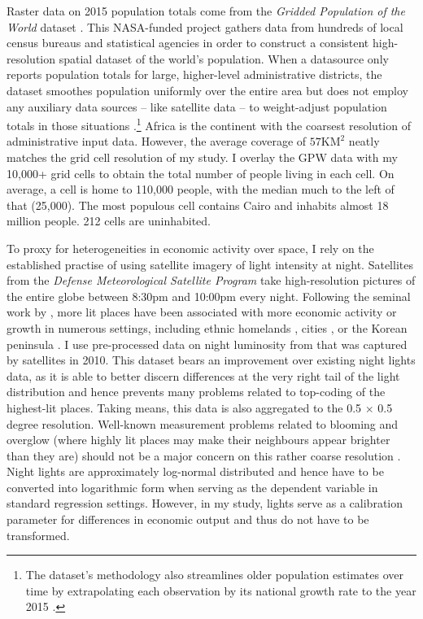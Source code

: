 \documentclass[11pt, oneside]{article}   	%
\begin{document}
Raster data on 2015 population totals come from the \textit{Gridded Population of the World} dataset \citep[GPW,][]{socioeconomic_data_and_applications_center_gridded_2016}. This NASA-funded project gathers data from hundreds of local census bureaus and statistical agencies in order to construct a consistent high-resolution spatial dataset of the world's population. When a datasource only reports population totals for large, higher-level administrative districts, the dataset smoothes population uniformly over the entire area but does not employ any auxiliary data sources -- like satellite data -- to weight-adjust population totals in those situations \citep{Doxsey-Whitfield_TakingAdvantageImproved_2015}.\footnote{The dataset's methodology also streamlines older population estimates over time by extrapolating each observation by its national growth rate to the year 2015 \citep{Doxsey-Whitfield_TakingAdvantageImproved_2015}.} Africa is the continent with the coarsest resolution of administrative input data. However, the average coverage of $57\textrm{KM}^{2}$ neatly matches the grid cell resolution of my study. I overlay the GPW data with my 10,000+ grid cells to obtain the total number of people living in each cell. On average, a cell is home to 110,000 people, with the median much to the left of that (25,000). The most populous cell contains Cairo and inhabits almost 18 million people. 212 cells are uninhabited.

To proxy for heterogeneities in economic activity over space, I rely on the established practise of using satellite imagery of light intensity at night. Satellites from the \textit{Defense Meteorological Satellite Program} take high-resolution pictures of the entire globe between 8:30pm and 10:00pm every night. Following the seminal work by \cite{henderson_measuring_2012}, more lit places have been associated with more economic activity or growth in numerous settings, including ethnic homelands \citep{michalopoulos_national_2014}, cities \citep{storeygard_farther_2016,Kocornik-Mina_Floodedcities_2015}, or the Korean peninsula \citep{Lee_InternationalIsolationRegional_2016}. I use pre-processed data on night luminosity from \cite{henderson_global_2018} that was captured by satellites in 2010. This dataset bears an improvement over existing night lights data, as it is able to better discern differences at the very right tail of the light distribution and hence prevents many problems related to top-coding of the highest-lit places. Taking means, this data is also aggregated to the 0.5 $\times$ 0.5 degree resolution. Well-known measurement problems related to blooming and overglow (where highly lit places may make their neighbours appear brighter than they are) should not be a major concern on this rather coarse resolution \citep{michalopoulos_spatial_2018}. Night lights are approximately log-normal distributed and hence have to be converted into logarithmic form when serving as the dependent variable in standard regression settings. However, in my study, lights serve as a calibration parameter for differences in economic output and thus do not have to be transformed.
\end{document}
